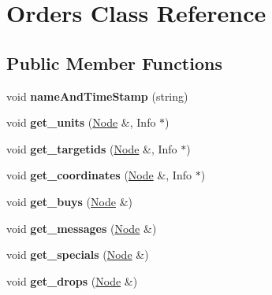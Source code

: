 \hypertarget{class_orders}{\section{Orders Class Reference}
\label{class_orders}
}
\subsection*{Public Member Functions}
\begin{DoxyCompactItemize}
\item 
\hypertarget{class_orders_a2b142a6720700b6e0f39b804c0e838a4}{void {\bfseries name\-And\-Time\-Stamp} (string)}\label{class_orders_a2b142a6720700b6e0f39b804c0e838a4}

\item 
\hypertarget{class_orders_abcb5d4cb35dc745ab33438a90e283aff}{void {\bfseries get\-\_\-units} (\hyperlink{class_jzon_1_1_node}{Node} \&, Info $\ast$)}\label{class_orders_abcb5d4cb35dc745ab33438a90e283aff}

\item 
\hypertarget{class_orders_a03971ccf1fa121eb1a8bb5d59872334d}{void {\bfseries get\-\_\-targetids} (\hyperlink{class_jzon_1_1_node}{Node} \&, Info $\ast$)}\label{class_orders_a03971ccf1fa121eb1a8bb5d59872334d}

\item 
\hypertarget{class_orders_a7c5875d9544aab63973510beda5c5282}{void {\bfseries get\-\_\-coordinates} (\hyperlink{class_jzon_1_1_node}{Node} \&, Info $\ast$)}\label{class_orders_a7c5875d9544aab63973510beda5c5282}

\item 
\hypertarget{class_orders_a85e506850d29bc4330b6716b3e175472}{void {\bfseries get\-\_\-buys} (\hyperlink{class_jzon_1_1_node}{Node} \&)}\label{class_orders_a85e506850d29bc4330b6716b3e175472}

\item 
\hypertarget{class_orders_ae1d3763c5006288cb9f261d7f446ae19}{void {\bfseries get\-\_\-messages} (\hyperlink{class_jzon_1_1_node}{Node} \&)}\label{class_orders_ae1d3763c5006288cb9f261d7f446ae19}

\item 
\hypertarget{class_orders_a91f87f34c7d647136392804de2834886}{void {\bfseries get\-\_\-specials} (\hyperlink{class_jzon_1_1_node}{Node} \&)}\label{class_orders_a91f87f34c7d647136392804de2834886}

\item 
\hypertarget{class_orders_a994526424a9d9731e94a59d07696e6bd}{void {\bfseries get\-\_\-drops} (\hyperlink{class_jzon_1_1_node}{Node} \&)}\label{class_orders_a994526424a9d9731e94a59d07696e6bd}

\end{DoxyCompactItemize}
